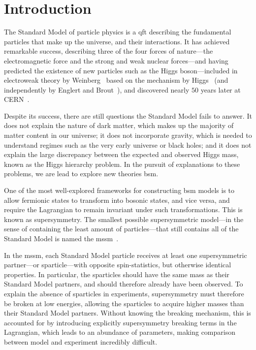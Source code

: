 \chapter*{Introduction}

The Standard Model of particle physics is a \acrfull{qft} describing the fundamental particles that make up the universe, and their interactions.
It has achieved remarkable success, describing three of the four forces of nature---the electromagnetic force and the strong and weak nuclear forces---and having predicted the existence of new particles such as the Higgs boson---included in electroweak theory by Weinberg~\cite{Weinberg:1967tq} based on the mechanism by Higgs~\cite{Higgs:1964ia,Higgs:1964pj,Higgs:1966ev} (and independently by Englert and Brout~\cite{Englert:1964et}), and discovered nearly $50$ years later at CERN~\cite{ATLAS:2012yve,CMS:2012qbp}.

Despite its success, there are still questions the Standard Model fails to answer.
It does not explain the nature of dark matter, which makes up the majority of matter content in our universe; it does not incorporate gravity, which is needed to understand regimes such as the very early universe or black holes; and it does not explain the large discrepancy between the expected and observed Higgs mass, known as the Higgs hierarchy problem.
In the pursuit of explanations to these problems, we are lead to explore new theories \acrfull{bsm}.

One of the most well-explored frameworks for constructing \gls{bsm} models is to allow fermionic states to transform into bosonic states, and vice versa, and require the Lagrangian to remain invariant under such transformations.
This is known as supersymmetry.
The smallest possible supersymmetric model---in the sense of containing the least amount of particles---that still contains all of the Standard Model is named the \acrfull{mssm}~\cite{Martin:1997ns}.

In the \gls{mssm}, each Standard Model particle receives at least one supersymmetric partner---or sparticle---with opposite spin-statistics, but otherwise identical properties.
In particular, the sparticles should have the same mass as their Standard Model partners, and should therefore already have been observed.
To explain the absence of sparticles in experiments, supersymmetry must therefore be broken at low energies, allowing the sparticles to acquire higher masses than their Standard Model partners.
Without knowing the breaking mechanism, this is accounted for by introducing explicitly supersymmetry breaking terms in the Lagrangian, which leads to an abundance of parameters, making comparison between model and experiment incredibly difficult.


